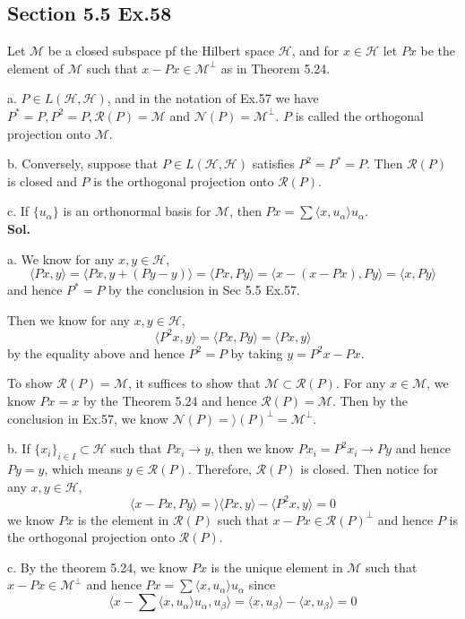 \documentclass[lang=en,11pt,a4paper,citestyle =authoryear]{elegantpaper}
\newcommand{\M}{\mathcal{M}}
\newcommand{\Hil}{\mathcal{H}}
\newcommand{\range}{\mathcal{R}}
\newcommand{\nul}{\mathcal{N}}
\begin{document}
\subsection*{Section 5.5 Ex.58} 
Let $\M$ be a closed subspace pf the Hilbert space $\Hil$, and for $x\in\Hil$ let $Px$ be the element of $\M$ such that $x-Px\in \M^{\perp}$ as in Theorem 5.24.\par
a. $P\in L(\Hil,\Hil)$, and in the notation of Ex.57 we have $P^* = P, P^2 = P,\range(P) = \M$ and $\nul(P) = \M^{\perp}$. $P$ is called the orthogonal projection onto $\M$.\par
b. Conversely, suppose that $P\in L(\Hil,\Hil)$ satisfies $P^2 = P^* = P$. Then $\range(P)$ is closed and $P$ is the orthogonal projection onto $\range(P)$.\par
c. If $\{u_{\alpha}\}$ is an orthonormal basis for $\M$, then $Px = \sum\langle x,u_{\alpha}\rangle u_{\alpha}$.
\vspace{0.5em}\\
\textbf{Sol.} \par
a. We know for any $x,y\in \Hil$,
\[\langle Px, y \rangle  = \langle Px, y+(Py-y)\rangle = \langle Px,Py\rangle = \langle x-(x-Px),Py\rangle = \langle x, Py\rangle\]
and hence $P^* = P$ by the conclusion in Sec 5.5 Ex.57.\par
Then we know for any $x,y\in \Hil$,
\[\langle P^2x, y\rangle = \langle Px, Py\rangle = \langle {Px,y}\rangle\]
by the equality above and hence $P^2 = P$ by taking $y=P^2x-Px$.\par
To show $\range(P) = \M$, it suffices to show that $\M \subset \range(P)$. For any $x\in\M$, we know $Px = x$ by the Theorem 5.24 and hence $\range(P) = \M$. Then by the conclusion in Ex.57, we know $\nul(P) = \rangle(P)^{\perp} = \M^{\perp}$.\par
b. If $\{x_i\}_{i\in I}\subset \Hil$ such that $Px_i \to y$, then we know $Px_i = P^2 x_i \to Py$ and hence $Py = y$, which means $y \in \range(P)$. Therefore, $\range(P)$ is closed. Then notice for any $x,y\in \Hil$,
\[ \langle x-Px, Py\rangle = \rangle \langle Px,y\rangle -\langle P^2x,y\rangle = 0\]
we know $Px$ is the element in $\range(P)$ such that $x-Px \in \range(P)^{\perp}$ and hence $P$ is the orthogonal projection onto $\range(P)$.\par
c. By the theorem 5.24, we know $Px$ is the unique element in $\M$ such that $x-Px\in\M^{\perp}$ and hence $Px = \sum\langle x, u_{\alpha}\rangle u_{\alpha}$ since 
\[\langle x- \sum\langle x,u_{\alpha}\rangle u_{\alpha}, u_{\beta} \rangle = \langle x,u_{\beta} \rangle - \langle x,u_{\beta}\rangle = 0\]
\end{document}
